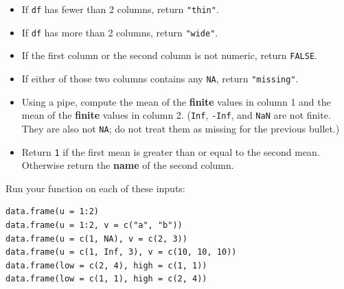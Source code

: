 \documentclass[11pt]{article}
\begin{document}
\begin{enumerate}
\begin{itemize}
  \item If \texttt{df} has fewer than 2 columns, return \texttt{"thin"}.
  \item If \texttt{df} has more than 2 columns, return \texttt{"wide"}.
  \item If the first column or the second column is not numeric, return \texttt{FALSE}.
  \item If either of those two columns contains any \texttt{NA}, return \texttt{"missing"}.
  \item Using a pipe, compute the mean of the \textbf{finite} values in column 1
        and the mean of the \textbf{finite} values in column 2.
        (\texttt{Inf}, \texttt{-Inf}, and \texttt{NaN} are not finite.
        They are also not \texttt{NA}; do not treat them as missing for the
        previous bullet.)
  \item Return \texttt{1} if the first mean is greater than or equal to the
        second mean. Otherwise return the \textbf{name} of the second column.
\end{itemize}

Run your function on each of these inputs:

\begin{lstlisting}
data.frame(u = 1:2)
data.frame(u = 1:2, v = c("a", "b"))
data.frame(u = c(1, NA), v = c(2, 3))
data.frame(u = c(1, Inf, 3), v = c(10, 10, 10))
data.frame(low = c(2, 4), high = c(1, 1))
data.frame(low = c(1, 1), high = c(2, 4))
\end{lstlisting}
\end{enumerate}
\end{document}
